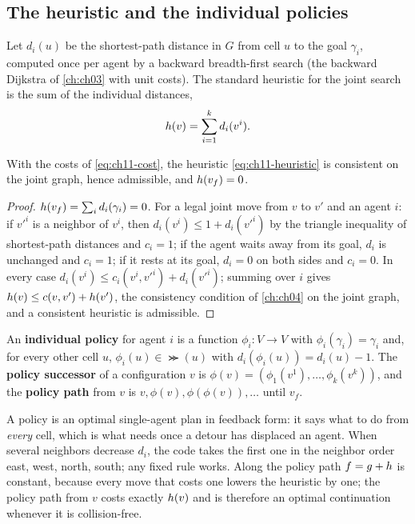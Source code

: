 \subsection{The heuristic and the individual policies}

Let $d_i(u)$ be the shortest-path distance in $G$ from cell $u$ to the goal
$\gamma_i$, computed once per agent by a backward breadth-first search (the
backward Dijkstra of \cref{ch:ch03} with unit costs). The standard
heuristic for the joint search is the sum of the individual
distances,
\begin{equation}
  h(v) = \sum_{i=1}^{k} d_i(v^i).
  \label{eq:ch11-heuristic}
\end{equation}

\begin{proposition}
\label{thm:ch11-heuristic}
With the costs of \cref{eq:ch11-cost}, the heuristic \cref{eq:ch11-heuristic}
is consistent on the joint graph, hence admissible, and $h(v_f) = 0$.
\end{proposition}
\begin{proof}
$h(v_f) = \sum_i d_i(\gamma_i) = 0$. For a legal joint move from $v$ to
$v'$ and an agent $i$: if $v'^i$ is a neighbor of $v^i$, then $d_i(v^i) \le
1 + d_i(v'^i)$ by the triangle inequality of shortest-path distances and
$c_i = 1$; if the agent waits away from its goal, $d_i$ is unchanged and
$c_i = 1$; if it rests at its goal, $d_i = 0$ on both sides and $c_i = 0$.
In every case $d_i(v^i) \le c_i(v^i, v'^i) + d_i(v'^i)$; summing over $i$
gives $h(v) \le c(v, v') + h(v')$, the consistency condition of
\cref{ch:ch04} on the joint graph, and a consistent heuristic is admissible.
\end{proof}

\begin{definition}
\label{def:ch11-policy}
An \textbf{individual policy} for agent $i$ is a
function $\phi_i \colon V \to V$ with $\phi_i(\gamma_i) = \gamma_i$ and, for
every other cell $u$, $\phi_i(u) \in \Succ(u)$ with $d_i(\phi_i(u)) =
d_i(u) - 1$. The \textbf{policy successor} of a configuration $v$ is
$\phi(v) = (\phi_1(v^1), \dots, \phi_k(v^k))$, and the \textbf{policy
path} from $v$ is $v, \phi(v), \phi(\phi(v)), \dots$
until $v_f$.
\end{definition}

A policy is an optimal single-agent plan in feedback form: it says what to
do from \emph{every} cell, which is what \mstar needs once a detour has
displaced an agent. When several neighbors decrease $d_i$, the code takes
the first one in the neighbor order east, west, north, south; any fixed
rule works. Along the policy path $f = g + h$ is constant,
because every move that costs one lowers the heuristic by one; the policy
path from $v$ costs exactly $h(v)$ and is therefore an optimal
continuation whenever it is collision-free.

